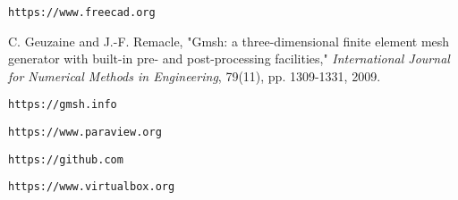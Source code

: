 \documentclass[titlepage]{article}
\renewcommand\_{\textunderscore\linebreak[1]}
\begin{document}
\begin{thebibliography}{unsrt}

 \verb+https://www.freecad.org+

 C. Geuzaine and J.-F. Remacle, "Gmsh: a three-dimensional finite element mesh generator with built-in pre- and post-processing facilities," \textit{International Journal for Numerical Methods in Engineering}, 79(11), pp. 1309-1331, 2009.

 \verb+https://gmsh.info+

 \verb+https://www.paraview.org+

 \verb+https://github.com+

 \verb+https://www.virtualbox.org+

\end{thebibliography}
\end{document}
